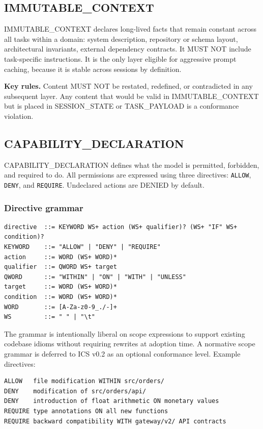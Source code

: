 \documentclass[11pt]{article}
\begin{document}
\subsection{IMMUTABLE\_CONTEXT}
\label{sec:ic}

IMMUTABLE\_CONTEXT declares long-lived facts that remain constant across all
tasks within a domain: system description, repository or schema layout,
architectural invariants, external dependency contracts. It MUST NOT include
task-specific instructions. It is the only layer eligible for aggressive
prompt caching, because it is stable across sessions by definition.

\textbf{Key rules.} Content MUST NOT be restated, redefined, or contradicted
in any subsequent layer. Any content that would be valid in IMMUTABLE\_CONTEXT
but is placed in SESSION\_STATE or TASK\_PAYLOAD is a conformance violation.

\subsection{CAPABILITY\_DECLARATION}
\label{sec:cd}

CAPABILITY\_DECLARATION defines what the model is permitted, forbidden, and
required to do. All permissions are expressed using three directives:
\texttt{ALLOW}, \texttt{DENY}, and \texttt{REQUIRE}. Undeclared actions are
DENIED by default.

\subsubsection{Directive grammar}
\label{sec:capgram}

\begin{lstlisting}[language=ICS]
directive  ::= KEYWORD WS+ action (WS+ qualifier)? (WS+ "IF" WS+ condition)?
KEYWORD    ::= "ALLOW" | "DENY" | "REQUIRE"
action     ::= WORD (WS+ WORD)*
qualifier  ::= QWORD WS+ target
QWORD      ::= "WITHIN" | "ON" | "WITH" | "UNLESS"
target     ::= WORD (WS+ WORD)*
condition  ::= WORD (WS+ WORD)*
WORD       ::= [A-Za-z0-9_./-]+
WS         ::= " " | "\t"
\end{lstlisting}

The grammar is intentionally liberal on scope expressions to support existing
codebase idioms without requiring rewrites at adoption time. A normative scope
grammar is deferred to ICS v0.2 as an optional conformance level. Example
directives:

\begin{lstlisting}[language=ICS]
ALLOW   file modification WITHIN src/orders/
DENY    modification of src/orders/api/
DENY    introduction of float arithmetic ON monetary values
REQUIRE type annotations ON all new functions
REQUIRE backward compatibility WITH gateway/v2/ API contracts
\end{lstlisting}
\end{document}
